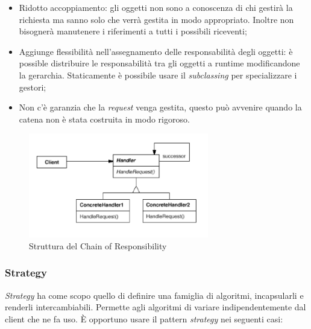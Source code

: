 \begin{itemize}

	\item Ridotto accoppiamento: gli oggetti non sono a conoscenza di chi gestirà la richiesta ma sanno solo che verrà gestita in modo appropriato. Inoltre non bisognerà manutenere i riferimenti a tutti i possibili riceventi;
	\item Aggiunge flessibilità nell'assegnamento delle responsabilità degli oggetti: è possible distribuire le responsabilità tra gli oggetti a runtime modificandone la gerarchia. Staticamente è possibile usare il \emph{subclassing} per specializzare i gestori;
 	\item Non c'è garanzia che la \emph{request} venga gestita, questo può avvenire quando la catena non è stata costruita in modo rigoroso.
 	
\end{itemize}
	 	
\begin{figure}[H]
\centering \includegraphics[width=0.7\textwidth]{patterns/ChainOfResponsability.png}
\caption{Struttura del Chain of Responsibility}
\label{fig:chainofresponsibility}
\end{figure}
	
\subsubsection{Strategy}

\textit{Strategy} ha come scopo quello di definire una famiglia di algoritmi, incapsularli e renderli intercambiabili. Permette agli algoritmi di variare indipendentemente dal client che ne fa uso. È opportuno usare il pattern \textit{strategy} nei seguenti casi:


